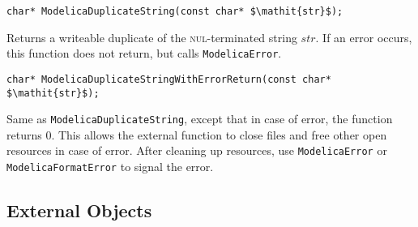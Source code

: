 \begin{functiondefinition}[ModelicaDuplicateString]
\begin{synopsis}[C]\begin{lstlisting}
char* ModelicaDuplicateString(const char* $\mathit{str}$);
\end{lstlisting}\end{synopsis}
\begin{semantics}
Returns a writeable duplicate of the \textsc{nul}-terminated string $\mathit{str}$.
If an error occurs, this function does not return, but calls {\lstinline[language=C]!ModelicaError!}.
\end{semantics}
\end{functiondefinition}

\begin{functiondefinition}[ModelicaDuplicateStringWithErrorReturn]
\begin{synopsis}[C]\begin{lstlisting}
char* ModelicaDuplicateStringWithErrorReturn(const char* $\mathit{str}$);
\end{lstlisting}\end{synopsis}
\begin{semantics}
Same as {\lstinline[language=C]!ModelicaDuplicateString!}, except that in case of error, the function returns 0.
This allows the external function to close files and free other open resources in case of error.
After cleaning up resources, use {\lstinline[language=C]!ModelicaError!} or {\lstinline[language=C]!ModelicaFormatError!} to signal the error.
\end{semantics}
\end{functiondefinition}

\subsection{External Objects}\label{external-objects}

